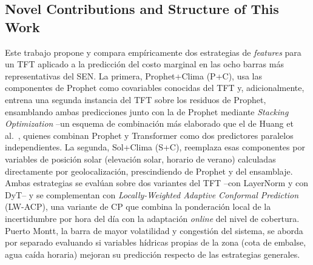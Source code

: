\documentclass[applsci,article,submit,moreauthors,pdftex]{Definitions/mdpi}
\begin{document}
\subsection{Novel Contributions and Structure of This Work}

Este trabajo propone y compara empíricamente dos estrategias de \textit{features} para un TFT aplicado a la predicción del costo marginal en las ocho barras más representativas del SEN. La primera, Prophet+Clima (P+C), usa las componentes de Prophet como covariables conocidas del TFT y, adicionalmente, entrena una segunda instancia del TFT sobre los residuos de Prophet, ensamblando ambas predicciones junto con la de Prophet mediante \textit{Stacking Optimization} --un esquema de combinación más elaborado que el de Huang et al.\ \cite{ProphetTransformers}, quienes combinan Prophet y Transformer como dos predictores paralelos independientes. La segunda, Sol+Clima (S+C), reemplaza esas componentes por variables de posición solar (elevación solar, horario de verano) calculadas directamente por geolocalización, prescindiendo de Prophet y del ensamblaje. Ambas estrategias se evalúan sobre dos variantes del TFT --con LayerNorm y con DyT-- y se complementan con \textit{Locally-Weighted Adaptive Conformal Prediction} (LW-ACP), una variante de CP que combina la ponderación local de la incertidumbre por hora del día con la adaptación \textit{online} del nivel de cobertura. Puerto Montt, la barra de mayor volatilidad y congestión del sistema, se aborda por separado evaluando si variables hídricas propias de la zona (cota de embalse, agua caída horaria) mejoran su predicción respecto de las estrategias generales.
\end{document}
